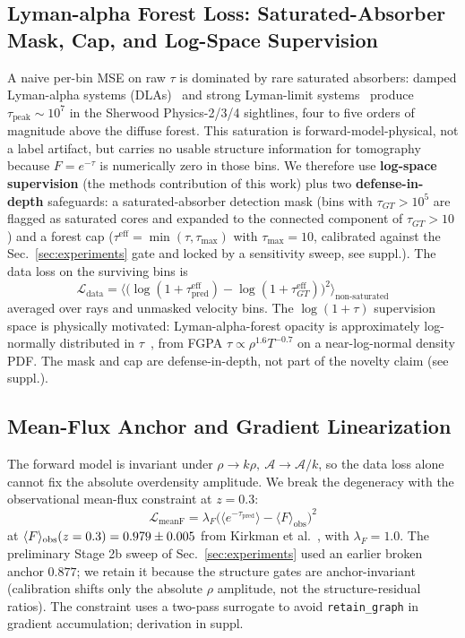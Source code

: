 \subsection{Lyman-alpha Forest Loss: Saturated-Absorber Mask, Cap, and Log-Space Supervision}
\label{sec:method:loss}
A naive per-bin MSE on raw $\tau$ is dominated by rare saturated absorbers: damped Lyman-alpha systems (DLAs)~\cite{wolfe2005} and strong Lyman-limit systems~\cite{prochaska2010} produce $\tau_{\text{peak}} \sim 10^7$ in the Sherwood Physics-2/3/4 sightlines, four to five orders of magnitude above the diffuse forest. This saturation is forward-model-physical, not a label artifact, but carries no usable structure information for tomography because $F = e^{-\tau}$ is numerically zero in those bins. We therefore use \textbf{log-space supervision} (the methods contribution of this work) plus two \textbf{defense-in-depth} safeguards: a saturated-absorber detection mask (bins with $\tau_{GT}>10^5$ are flagged as saturated cores and expanded to the connected component of $\tau_{GT}>10$) and a forest cap ($\tau^{\text{eff}}=\min(\tau,\tau_{\max})$ with $\tau_{\max}=10$, calibrated against the Sec.~\ref{sec:experiments} gate and locked by a sensitivity sweep, see suppl.). The data loss on the surviving bins is
\begin{equation}
\mathcal{L}_{\text{data}} = \big\langle \big( \log(1 + \tau_{\text{pred}}^{\text{eff}}) - \log(1 + \tau_{GT}^{\text{eff}}) \big)^2 \big\rangle_{\text{non-saturated}}
\label{eq:data-loss}
\end{equation}
averaged over rays and unmasked velocity bins. The $\log(1+\tau)$ supervision space is physically motivated: Lyman-alpha-forest opacity is approximately log-normally distributed in $\tau$~\cite{bi_davidsen1997, hui_gnedin1997}, from FGPA $\tau \propto \rho^{1.6} T^{-0.7}$ on a near-log-normal density PDF. The mask and cap are defense-in-depth, not part of the novelty claim (see suppl.).

\subsection{Mean-Flux Anchor and Gradient Linearization}
The forward model is invariant under $\rho \to k\rho,\ \mathcal{A} \to \mathcal{A}/k$, so the data loss alone cannot fix the absolute overdensity amplitude. We break the degeneracy with the observational mean-flux constraint at $z = 0.3$:
\begin{equation}
\mathcal{L}_{\text{meanF}} = \lambda_F \big( \langle e^{-\tau_{\text{pred}}}\rangle - \langle F\rangle_{\text{obs}} \big)^2
\end{equation}
at $\langle F\rangle_{\text{obs}}(z=0.3) = 0.979 \pm 0.005$ from Kirkman et al.~\cite{kirkman2007}, with $\lambda_F = 1.0$. The preliminary Stage 2b sweep of Sec.~\ref{sec:experiments} used an earlier broken anchor $0.877$; we retain it because the structure gates are anchor-invariant (calibration shifts only the absolute $\rho$ amplitude, not the structure-residual ratios). The constraint uses a two-pass surrogate to avoid \texttt{retain\_graph} in gradient accumulation; derivation in suppl.

